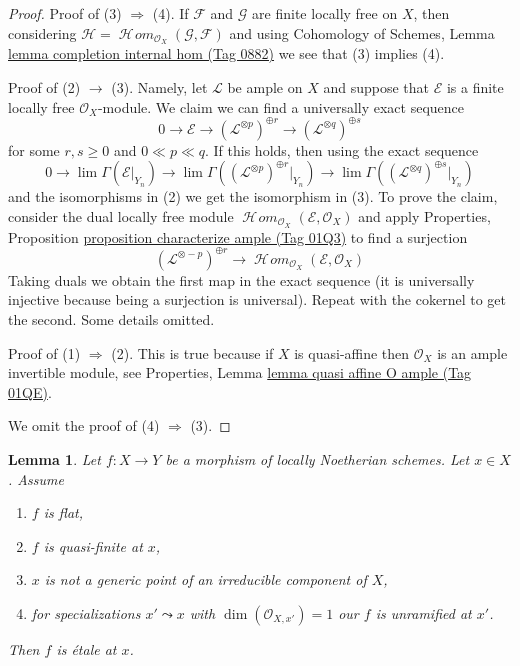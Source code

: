 \documentclass{amsart}
\theoremstyle{plain}
\newtheorem{lemma}[subsection]{Lemma}
\theoremstyle{definition}
\theoremstyle{remark}
\numberwithin{equation}{subsection}
\def\lim{\mathop{\mathrm{lim}}\nolimits}
\def\SheafHom{\mathop{\mathcal{H}\!\mathit{om}}\nolimits}
\begin{document}
\begin{proof}
Proof of (3) $\Rightarrow$ (4). If $\mathcal{F}$ and $\mathcal{G}$
are finite locally free on $X$, then considering
$\mathcal{H} = \SheafHom_{\mathcal{O}_X}(\mathcal{G}, \mathcal{F})$
and using Cohomology of Schemes, Lemma
\href{https://stacks.math.columbia.edu/tag/0882}{lemma completion internal hom (Tag 0882)}
we see that (3) implies (4).

\medskip\noindent
Proof of (2) $\rightarrow$ (3). Namely, let $\mathcal{L}$ be ample
on $X$ and suppose that $\mathcal{E}$ is a
finite locally free $\mathcal{O}_X$-module.
We claim we can find a universally exact sequence
$$
0 \to \mathcal{E} \to
(\mathcal{L}^{\otimes p})^{\oplus r} \to
(\mathcal{L}^{\otimes q})^{\oplus s}
$$
for some $r, s \geq 0$ and $0 \ll p \ll q$. If this holds, then
using the exact sequence
$$
0 \to \lim \Gamma(\mathcal{E}|_{Y_n}) \to
\lim \Gamma((\mathcal{L}^{\otimes p})^{\oplus r}|_{Y_n}) \to
\lim \Gamma((\mathcal{L}^{\otimes q})^{\oplus s}|_{Y_n})
$$
and the isomorphisms in (2) we get the isomorphism in (3).
To prove the claim, consider the dual locally free module
$\SheafHom_{\mathcal{O}_X}(\mathcal{E}, \mathcal{O}_X)$
and apply
Properties, Proposition \href{https://stacks.math.columbia.edu/tag/01Q3}{proposition characterize ample (Tag 01Q3)}
to find a surjection
$$
(\mathcal{L}^{\otimes -p})^{\oplus r}
\longrightarrow
\SheafHom_{\mathcal{O}_X}(\mathcal{E}, \mathcal{O}_X)
$$
Taking duals we obtain the first map in the exact sequence
(it is universally injective because being a surjection is universal).
Repeat with the cokernel to get the second. Some details omitted.

\medskip\noindent
Proof of (1) $\Rightarrow$ (2). This is true because if $X$ is quasi-affine
then $\mathcal{O}_X$ is an ample invertible module, see
Properties, Lemma \href{https://stacks.math.columbia.edu/tag/01QE}{lemma quasi affine O ample (Tag 01QE)}.

\medskip\noindent
We omit the proof of (4) $\Rightarrow$ (3).
\end{proof}


\begin{lemma}
\label{lemma-ramification-quasi-finite-flat}
Let $f : X \to Y$ be a morphism of locally Noetherian schemes.
Let $x \in X$. Assume
\begin{enumerate}
\item $f$ is flat,
\item $f$ is quasi-finite at $x$,
\item $x$ is not a generic point of an irreducible component of $X$,
\item for specializations $x' \leadsto x$ with
$\dim(\mathcal{O}_{X, x'}) = 1$ our $f$ is unramified at $x'$.
\end{enumerate}
Then $f$ is \'etale at $x$.
\end{lemma}
\end{document}
